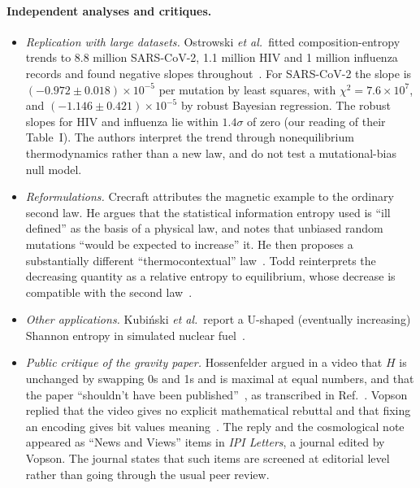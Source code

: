 \paragraph{Independent analyses and critiques.}
\begin{itemize}
\item \emph{Replication with large datasets.} Ostrowski \textit{et al.}\ fitted composition-entropy
  trends to 8.8 million SARS-CoV-2, 1.1 million HIV and 1 million influenza records and found
  negative slopes throughout~\cite{Ostrowski2024entropy}. For SARS-CoV-2 the slope is
  $(-0.972\pm0.018)\times10^{-5}$ per mutation by least squares, with $\chi^2=7.6\times10^{7}$,
  and $(-1.146\pm0.421)\times10^{-5}$ by robust Bayesian regression. The robust slopes for HIV and
  influenza lie within $1.4\sigma$ of zero (our reading of their Table~I). The authors interpret the trend through nonequilibrium
  thermodynamics rather than a new law, and do not test a mutational-bias null model.
\item \emph{Reformulations.} Crecraft attributes the magnetic example to the ordinary second law.
  He argues that the statistical information entropy used is ``ill defined'' as the basis of a
  physical law, and notes that unbiased random mutations ``would be expected to increase'' it. He
  then proposes a substantially different ``thermocontextual'' law~\cite{Crecraft2024second}.
  Todd reinterprets the decreasing quantity as a relative entropy to equilibrium, whose decrease
  is compatible with the second law~\cite{Todd2026thermodynamic}.
\item \emph{Other applications.} Kubi\'nski \textit{et al.}\ report a U-shaped (eventually
  increasing) Shannon entropy in simulated nuclear fuel~\cite{Kubinski2024shannon}.
\item \emph{Public critique of the gravity paper.} Hossenfelder argued in a video that $H$ is
  unchanged by swapping 0s and 1s and is maximal at equal numbers, and that the paper ``shouldn't
  have been published''~\cite{Hossenfelder2025gravity}, as transcribed in Ref.~\cite{Vopson2025response}. Vopson replied that the video gives no
  explicit mathematical rebuttal and that fixing an encoding gives bit values
  meaning~\cite{Vopson2025response}. The reply and the cosmological note appeared as ``News and
  Views'' items in \emph{IPI Letters}, a journal edited by Vopson. The journal states that such
  items are screened at editorial level rather than going through the usual peer review.
\end{itemize}

